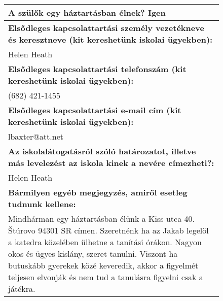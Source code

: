 \documentclass[10pt,a4paper]{article}
\begin{document}
\begin{figure}[!ht]
\begin{tabular}{|m{\textwidth}|}
\hline\vspace{3pt}
\textbf{A szülők egy háztartásban élnek? } \hspace{0.5cm} Igen \vspace{3pt} \\
\hline\vspace{3pt}
\textbf{Elsődleges kapcsolattartási személy vezetékneve és keresztneve (kit kereshetünk iskolai ügyekben):} \\ \hspace{0.5cm} Helen Heath \vspace{3pt} \\
\hline\vspace{3pt}
\textbf{Elsődleges kapcsolattartási telefonszám (kit kereshetünk iskolai ügyekben):} \\ \hspace{0.5cm} (682) 421-1455 \vspace{3pt} \\
\hline\vspace{3pt}
\textbf{Elsődleges kapcsolattartási e-mail cím (kit kereshetünk iskolai ügyekben):} \\ \hspace{0.5cm} lbaxter@att.net \vspace{3pt} \\
\hline\vspace{3pt}
\textbf{Az iskolalátogatásról szóló határozatot, illetve más levelezést az iskola kinek a nevére címezheti?:} \\ \hspace{0.5cm} Helen Heath \vspace{3pt} \\
\hline\vspace{3pt}
\textbf{Bármilyen egyéb megjegyzés, amiről esetleg tudnunk kellene:} \\ \hspace{0.5cm} Mindhárman egy háztartásban élünk a Kiss utca 40. Štúrovo 94301 SR címen.
Szeretnénk ha az Jakab legelöl a katedra közelében ülhetne a tanítási órákon. Nagyon okos és ügyes kislány, szeret tanulni. Viszont ha butuskább gyerekek közé keveredik, akkor a figyelmét teljesen elvonják és nem tud a tanulásra figyelni csak a játékra. \vspace{3pt} \\


\end{tabular}
\end{figure}
\end{document}
